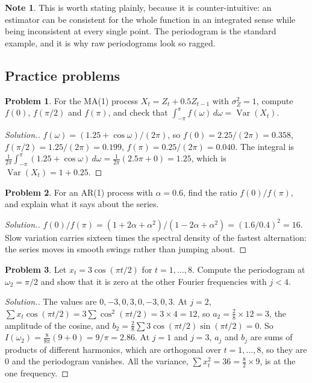 \documentclass[11pt,a4paper]{article}
\theoremstyle{definition}
\newtheorem*{note}{Note}
\newtheorem{problemx}{Problem}[subsection]
\newenvironment{problem}{\begin{problemx}}{\end{problemx}}
\newenvironment{solution}
  {\renewcommand{\qedsymbol}{}\begin{proof}[\textit{Solution}.]}
  {\end{proof}}
\DeclareMathOperator{\Var}{Var}
\begin{document}
\begin{note}
This is worth stating plainly, because it is counter-intuitive: an estimator can be consistent for the
whole function in an integrated sense while being inconsistent at every single point. The periodogram is the
standard example, and it is why raw periodograms look so ragged.
\end{note}

\subsection{Practice problems}
\begin{problem}\label{prob:ma1-spectrum}
For the MA(1) process $X_t = Z_t + 0.5Z_{t-1}$ with $\sigma_Z^2 = 1$, compute $f(0)$, $f(\pi/2)$ and $f(\pi)$, and check that $\int_{-\pi}^\pi f(\omega)\,d\omega = \Var(X_t)$.
\end{problem}

\begin{solution}
$f(\omega) = (1.25 + \cos\omega)/(2\pi)$, so $f(0) = 2.25/(2\pi) = 0.358$, $f(\pi/2) = 1.25/(2\pi) = 0.199$, $f(\pi) = 0.25/(2\pi) = 0.040$. The integral is
$\frac1{2\pi}\int_{-\pi}^\pi(1.25 + \cos\omega)\,d\omega = \frac1{2\pi}(2.5\pi + 0) = 1.25$, which is $\Var(X_t) = 1 + 0.25$.
\end{solution}

\begin{problem}\label{prob:ar1-spectrum-ratio}
For an AR(1) process with $\alpha = 0.6$, find the ratio $f(0)/f(\pi)$, and explain what it says about the series.
\end{problem}

\begin{solution}
$f(0)/f(\pi) = (1 + 2\alpha + \alpha^2)/(1 - 2\alpha + \alpha^2) = (1.6/0.4)^2 = 16$. Slow variation carries sixteen times the spectral density of the fastest
alternation: the series moves in smooth swings rather than jumping about.
\end{solution}

\begin{problem}\label{prob:cosine-periodogram}
Let $x_t = 3\cos(\pi t/2)$ for $t = 1, \dots, 8$. Compute the periodogram at $\omega_2 = \pi/2$ and show that it is zero at the other Fourier
frequencies with $j < 4$.
\end{problem}

\begin{solution}
The values are $0, -3, 0, 3, 0, -3, 0, 3$. At $j = 2$, $\sum x_t\cos(\pi t/2) = 3\sum\cos^2(\pi t/2) = 3 \times 4 = 12$, so $a_2 = \frac28 \times 12 = 3$, the
amplitude of the cosine, and $b_2 = \frac28\sum3\cos(\pi t/2)\sin(\pi t/2) = 0$. So $I(\omega_2) = \frac{8}{8\pi}(9 + 0) = 9/\pi = 2.86$. At $j = 1$ and $j = 3$, $a_j$ and $b_j$ are
sums of products of different harmonics, which are orthogonal over $t = 1, \dots, 8$, so they are $0$ and the periodogram
vanishes. All the variance, $\sum x_t^2 = 36 = \frac82 \times 9$, is at the one frequency.
\end{solution}
\end{document}
